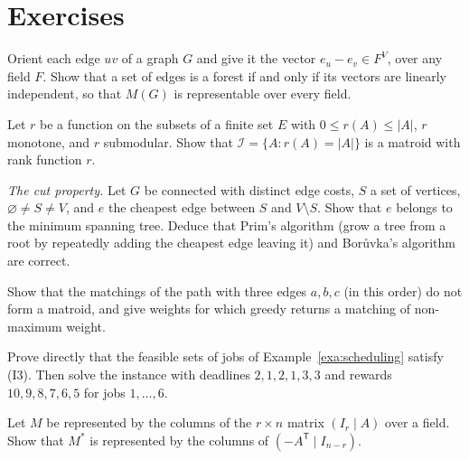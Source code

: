 \section{Exercises}

\begin{exercise}[$\star$]\label{ex:graphiclinear}
Orient each edge $uv$ of a graph $G$ and give it the vector $e_u-e_v\in F^V$, over any field $F$. Show that a set of edges is a forest if and only if its vectors are linearly independent, so that $M(G)$ is
representable over every field.
\end{exercise}

\begin{exercise}[$\star\star$]\label{ex:rankaxioms}
Let $r$ be a function on the subsets of a finite set $E$ with $0\le r(A)\le|A|$, $r$ monotone, and $r$ submodular. Show that $\mathcal I=\{A:r(A)=|A|\}$ is a matroid with rank function $r$.
\end{exercise}

\begin{exercise}[$\star$]\label{ex:prim}
\emph{The cut property.} Let $G$ be connected with distinct edge costs, $S$ a set of vertices, $\varnothing\ne S\ne V$, and $e$ the cheapest edge between $S$ and $V\setminus S$. Show that $e$ belongs to the minimum spanning tree.
Deduce that Prim's algorithm (grow a tree from a root by repeatedly adding the cheapest edge leaving it) and Bor\r{u}vka's algorithm are correct.
\end{exercise}

\begin{exercise}[$\star$]\label{ex:greedyfail}
Show that the matchings of the path with three edges $a,b,c$ (in this order) do not form a matroid, and give weights for which greedy returns a matching of non-maximum weight.
\end{exercise}

\begin{exercise}[$\star$]\label{ex:schedule}
Prove directly that the feasible sets of jobs of Example~\ref{exa:scheduling} satisfy (I3). Then solve the instance with deadlines $2,1,2,1,3,3$ and rewards $10,9,8,7,6,5$ for jobs $1,\dots,6$.
\end{exercise}

\begin{exercise}[$\star\star$]\label{ex:lineardual}
Let $M$ be represented by the columns of the $r\times n$ matrix $(I_r\mid A)$ over a field. Show that $M^*$ is represented by the columns of $(-A^{\mathsf T}\mid I_{n-r})$.
\end{exercise}

